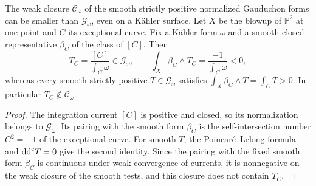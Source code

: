 \begin{example}\label{ex:gauduchon-current-smoothing-obstruction}
The weak closure $\mathscr C_\omega$ of the smooth strictly positive normalized Gauduchon forms can be smaller than $\mathscr G_\omega$, even on a K\"ahler surface. Let $X$ be the blowup of $\mathbb P^2$ at one point and $C$ its exceptional curve. Fix a K\"ahler form $\omega$ and a smooth closed representative $\beta_C$ of the class of $[C]$. Then
\[
 T_C=\frac{[C]}{\int_C\omega}\in\mathscr G_\omega,
 \qquad
 \int_X\beta_C\wedge T_C=\frac{-1}{\int_C\omega}<0,
\]
whereas every smooth strictly positive $T\in\mathscr G_\omega$ satisfies $\int_X\beta_C\wedge T=\int_C T>0$. In particular $T_C\notin\mathscr C_\omega$.
\end{example}
\begin{proof}
The integration current $[C]$ is positive and closed, so its normalization belongs to $\mathscr G_\omega$. Its pairing with the smooth form $\beta_C$ is the self-intersection number $C^2=-1$ of the exceptional curve. For smooth $T$, the Poincar\'e--Lelong formula and $\mathrm{dd}^{\mathrm{c}} T=0$ give the second identity. Since the pairing with the fixed smooth form $\beta_C$ is continuous under weak convergence of currents, it is nonnegative on the weak closure of the smooth tests, and this closure does not contain $T_C$.
\end{proof}

